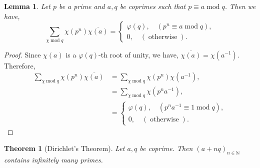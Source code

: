\documentclass{article}
\newtheorem{theorem}{Theorem} [section]
\newtheorem{lemma}{Lemma}[section]
\DeclareMathOperator{\tmod}{mod}
\DeclareMathOperator{\otherwise}{otherwise}
\newcommand{\N}[0]{\mathbb{N}}
\begin{document}
\begin{lemma}
  Let $p$ be a prime and $a,q$ be coprimes such that $p\equiv a \tmod q$. Then we have,
  \begin{equation*}
    \sum_{\chi\tmod q}\chi(p^n)\overline{\chi(a)} = \begin{cases}
      \varphi(q),\quad (p^n \equiv a \tmod q),\\
      0,\quad(\otherwise).
    \end{cases}
  \end{equation*}
  \label{lemma_dirichlet_lemma_1}
\end{lemma}

\begin{proof}
  Since $\chi(a)$ is a $\varphi(q)$-th root of unity, we have, $\overline{\chi(a)} = \chi(a^{-1})$. Therefore,
  \begin{align*}
    \sum_{\chi\tmod q}\chi(p^n)\overline{\chi(a)} & = \sum_{\chi\tmod q}\chi(p^n)\chi(a^{-1}),\\
    & = \sum_{\chi\tmod q}\chi(p^na^{-1}),\\
    & = \begin{cases}
      \varphi(q),\quad (p^na^{-1} \equiv 1 \tmod q),\\
      0,\quad(\otherwise).
    \end{cases}
  \end{align*}
\end{proof}

\begin{theorem}[Dirichlet's Theorem]
  Let $a,q$ be coprime. Then $(a+nq)_{n\in\N}$ contains infinitely many primes.
\end{theorem}
\end{document}
